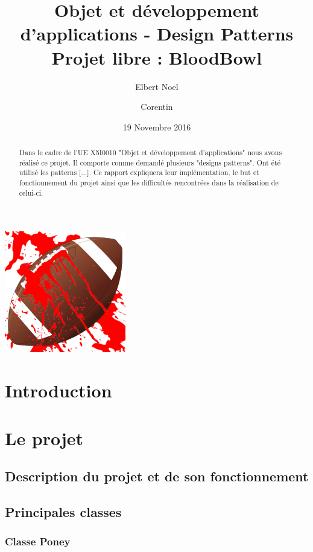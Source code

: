 \documentclass{article}
\title{Objet et développement d'applications - Design Patterns\\
Projet libre : BloodBowl}
\author{Elbert Noel \bsc{NYUNTING} \and Corentin \bsc{CHÉDOTAL}}
\date{19 Novembre 2016}
\begin{document}
\maketitle

\centerline{\includegraphics[scale=0.75]{img/logo.png}}

\begin{abstract}
    Dans le cadre de l'UE X5I0010 "Objet et développement d'applications" nous avons réalisé ce projet. Il comporte comme demandé plusieurs "designs patterns". Ont été utilisé les patterns [...]. Ce rapport expliquera leur implémentation, le but et fonctionnement du projet ainsi que les difficultés rencontrées dans la réalisation de celui-ci.
\end{abstract}

\tableofcontents

\section{Introduction}

\section{Le projet}

    \subsection{Description du projet et de son fonctionnement}

    \subsection{Principales classes}

        \subsubsection{Classe Poney}
\end{document}

